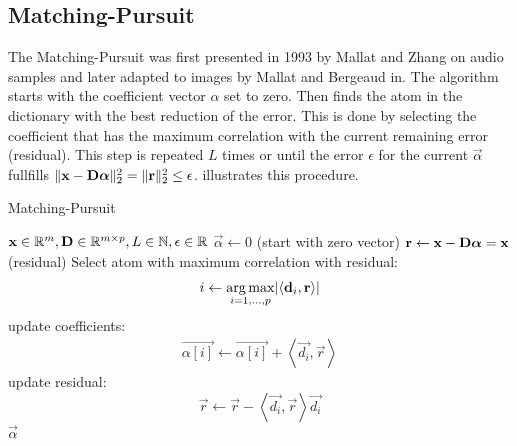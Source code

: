 \subsection{Matching-Pursuit}
\label{sec:mp}
The Matching-Pursuit was first presented in 1993 by Mallat and
Zhang\cite{Mallat1993} on audio samples and later adapted to images by Mallat
and Bergeaud in\cite{Mallat1995}.
The algorithm starts with the coefficient vector $\alpha$ set
to zero. Then finds the atom in the dictionary with the best reduction of the
error. This is done by selecting the coefficient that has the maximum
correlation with the current remaining error (residual). This step is repeated
$L$ times or until the error $\epsilon$
for the current $\vec{\alpha}$ fullfills $\lVert \boldsymbol{\mathrm{x}} - \boldsymbol{\mathrm{D}}\boldsymbol{\mathrm{\alpha}}
\rVert^{2}_{2} = \lVert \boldsymbol{\mathrm{r}} \rVert_2^2 \leq \epsilon$.
 illustrates this procedure.
\begin{algorithm}[h]
\caption{Matching-Pursuit}
\label{alg:mp}
\begin{algorithmic}[1]
\REQUIRE $\boldsymbol{\mathrm{x}} \in \mathbb{R}^m, \boldsymbol{\mathrm{D}} \in \mathbb{R}^{m\times p}, L \in
\mathbb{N}, \epsilon \in \mathbb{R}$
\STATE $\vec{\alpha} \gets 0$ (start with zero vector)
\STATE $\boldsymbol{\mathrm{r}} \gets \boldsymbol{\mathrm{x}}-\boldsymbol{\mathrm{D}}\boldsymbol{\mathrm{\alpha}} = \boldsymbol{\mathrm{x}}$ (residual) 
\STATE Select atom with maximum correlation with residual: 
\begin{equation*}
i \gets \operatorname*{arg\,max}_{i=1,...,p} \lvert \left<\boldsymbol{\mathrm{d}}_i,\boldsymbol{\mathrm{r}}\right> \rvert
\end{equation*}
\STATE update coefficients: 
\begin{align}
\vec{\alpha[i]}  \gets \vec{\alpha[i]} + \left<\vec{d_i},\vec{r}\right>
\label{eq:mp_update}
\end{align}
\STATE update residual:
\begin{equation*}
 \vec{r} \gets \vec{r} - \left<\vec{d_i},\vec{r}\right>\vec{d_i}
\end{equation*}
\ENDWHILE
\RETURN $\vec{\alpha}$
\end{algorithmic}
\end{algorithm}

